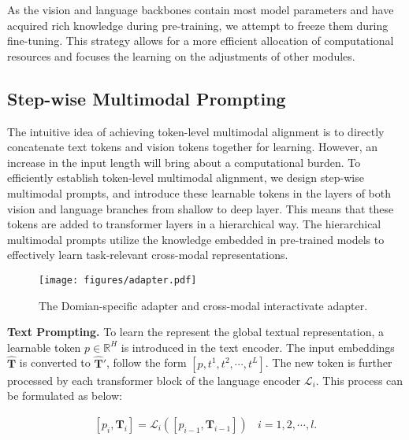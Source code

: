 As the vision and language backbones contain most model parameters and have acquired rich knowledge during pre-training, we attempt to freeze them during fine-tuning. This strategy allows for a more efficient allocation of computational resources and focuses the learning on the adjustments of other modules.



\subsection{Step-wise Multimodal Prompting} 
The intuitive idea of achieving token-level multimodal alignment is to directly concatenate text tokens and vision tokens together for learning. However, an increase in the input length will bring about a computational burden. To efficiently establish token-level multimodal alignment, we design step-wise multimodal prompts, and introduce these learnable tokens in the layers of both vision and language branches from shallow to deep layer. This means that these tokens are added to transformer layers in a hierarchical way. The hierarchical multimodal prompts utilize the knowledge embedded in pre-trained models to effectively learn task-relevant cross-modal representations. 


\begin{figure}
\centering
\texttt{[image: figures/adapter.pdf]}
\caption{The Domian-specific adapter and cross-modal interactivate adapter.}
\label{fig:adapter}
\end{figure}

\noindent
\textbf{Text Prompting.}
To learn the represent the global textual representation, a learnable token $p \in \mathbb{R}^{H}$ is introduced in the text encoder. The input embeddings $\bm {\hat T}$ is converted to $ \bm{\hat T'}$, follow the form $[p,t^1, t^2, \cdots, t^L]$. The new token is further processed by each transformer block of the language encoder $\mathcal{L}_{i}$. This process can be formulated as below:

\begin{equation}
\begin{aligned}
[{p_i}, \bm {T}_{i}] = \mathcal{L}_{i}([p_{i-1}, \bm {T}_{i-1}]) ~~~~ i=1, 2, \cdots, l.
\end{aligned}
\end{equation}


